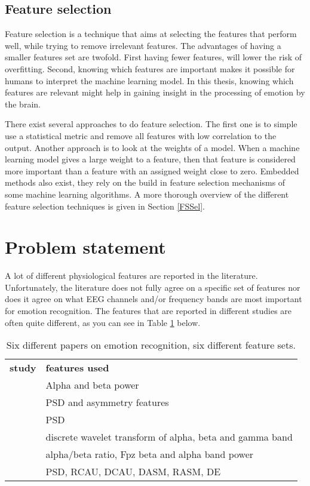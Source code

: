 
\subsection{Feature selection}
Feature selection is a technique that aims at selecting the features that perform well, while trying to remove irrelevant features\citep{rfPaper}. The advantages of having a smaller features set are twofold. First having fewer features, will lower the risk of overfitting\citep{rfPaper}. Second, knowing which features are important makes it possible for humans to interpret the machine learning model. In this thesis, knowing which features are relevant might help in gaining insight in the processing of emotion by the brain. 

\npar

There exist several approaches to do feature selection. The first one is to simple use a statistical metric and remove all features with low correlation to the output. Another approach is to look at the weights of a model. When a machine learning model gives a large weight to a feature, then that feature is considered more important than a feature with an assigned weight close to zero. Embedded methods also exist, they rely on the build in feature selection mechanisms of some machine learning algorithms. A more thorough  overview of the different feature selection techniques is given in Section \ref{FSSel}. 

\section{Problem statement}

A lot of different physiological features are reported in the literature. Unfortunately, the literature does not fully agree on a specific set of features nor does it agree on what EEG channels and/or frequency bands are most important for emotion recognition. The features that are reported in different studies are often quite different, as you can see in Table \ref{diffFeat} below.

\begin{table}[H]
\centering
\caption{Six different papers on emotion recognition, six different feature sets\label{diffFeat}.}
\begin{tabular}{ll}
\textbf{study} & \textbf{features used}                         \\
\citep{ref4}     & Alpha and beta power                           \\
\citep{ref7}     & PSD and asymmetry features                     \\
\citep{ref8}     & PSD                                            \\
\citep{ref6}     & discrete wavelet transform of alpha, beta and gamma band \\
\citep{ExtendedPaper}	&	alpha/beta ratio, Fpz beta and alpha band power \\
\citep{killyPaper} & PSD, RCAU, DCAU, DASM, RASM, DE \\
\end{tabular}
\end{table}

